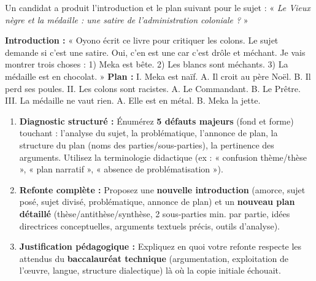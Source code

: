 \documentclass[11pt]{article}
\begin{document}
\begin{exercice}
Un candidat a produit l'introduction et le plan suivant pour le sujet : « \textit{Le Vieux nègre et la médaille : une satire de l'administration coloniale ?} »

\textbf{Introduction :} « Oyono écrit ce livre pour critiquer les colons. Le sujet demande si c'est une satire. Oui, c'en est une car c'est drôle et méchant. Je vais montrer trois choses : 1) Meka est bête. 2) Les blancs sont méchants. 3) La médaille est en chocolat. »
\textbf{Plan :}
I. Meka est naïf. A. Il croit au père Noël. B. Il perd ses poules.
II. Les colons sont racistes. A. Le Commandant. B. Le Prêtre.
III. La médaille ne vaut rien. A. Elle est en métal. B. Meka la jette.

\begin{enumerate}
    \item \textbf{Diagnostic structuré :} Énumérez \textbf{5 défauts majeurs} (fond et forme) touchant : l'analyse du sujet, la problématique, l'annonce de plan, la structure du plan (noms des parties/sous-parties), la pertinence des arguments. Utilisez la terminologie didactique (ex : « confusion thème/thèse », « plan narratif », « absence de problématisation »).
    \item \textbf{Refonte complète :} Proposez une \textbf{nouvelle introduction} (amorce, sujet posé, sujet divisé, problématique, annonce de plan) et un \textbf{nouveau plan détaillé} (thèse/antithèse/synthèse, 2 sous-parties min. par partie, idées directrices conceptuelles, arguments textuels précis, outils d'analyse). 
    \item \textbf{Justification pédagogique :} Expliquez en quoi votre refonte respecte les attendus du \textbf{baccalauréat technique} (argumentation, exploitation de l'œuvre, langue, structure dialectique) là où la copie initiale échouait.
\end{enumerate}
\end{exercice}
\end{document}

